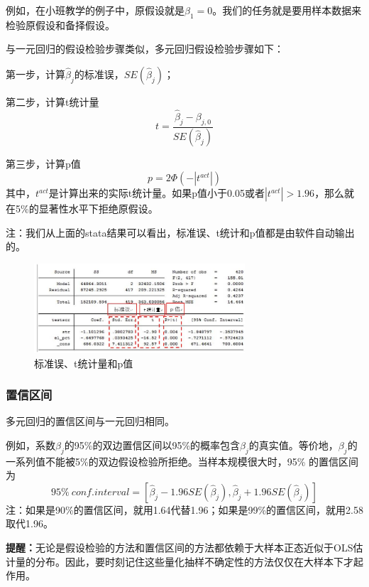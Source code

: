 \documentclass[cn,10pt,math=newtx,citestyle=gb7714-2015,bibstyle=gb7714-2015]{elegantbook}
\begin{document}
	例如，在小班教学的例子中，原假设就是$\beta_1=0$。我们的任务就是要用样本数据来检验原假设和备择假设。
	
	与一元回归的假设检验步骤类似，多元回归假设检验步骤如下：
	
	第一步，计算$\hat{\beta}_j$的标准误，$SE(\hat{\beta}_j)$；
	
	第二步，计算t统计量
	\begin{equation}
		t=\frac{\hat{\beta}_j-\beta_{j,0}}{SE(\hat{\beta}_j)}
	\end{equation}
	
	第三步，计算p值
	\begin{equation}
		p=2\Phi(-|t^{act}|)
	\end{equation}
	其中，$t^{act}$是计算出来的实际t统计量。如果p值小于0.05或者$|t^{act}|>1.96$，那么就在5\%的显著性水平下拒绝原假设。
	
	注：我们从上面的stata结果可以看出，标准误、t统计和p值都是由软件自动输出的。
	\begin{figure}[htbp]
		\centering
		\includegraphics[width=0.7\textwidth]{SE.jpg}
		\caption{标准误、t统计量和p值}\label{fig:digit}
	\end{figure}
	
	\subsubsection{置信区间}
	多元回归的置信区间与一元回归相同。
	
	例如，系数$\beta_j$的95\%的双边置信区间以95\%的概率包含$\beta_j$的真实值。等价地，$\beta_j$的一系列值不能被5\%的双边假设检验所拒绝。当样本规模很大时，95\% 的置信区间为
	\begin{equation}
		95\%~conf. interval=[\hat{\beta}_j-1.96SE(\hat{\beta}_j),\hat{\beta}_j+1.96SE(\hat{\beta}_j)]
	\end{equation}
	注：如果是90\%的置信区间，就用1.64代替1.96；如果是99\%的置信区间，就用2.58取代1.96。
	
	\textbf{提醒：}无论是假设检验的方法和置信区间的方法都依赖于大样本正态近似于OLS估计量的分布。因此，要时刻记住这些量化抽样不确定性的方法仅仅在大样本下才起作用。
	
\end{document}
